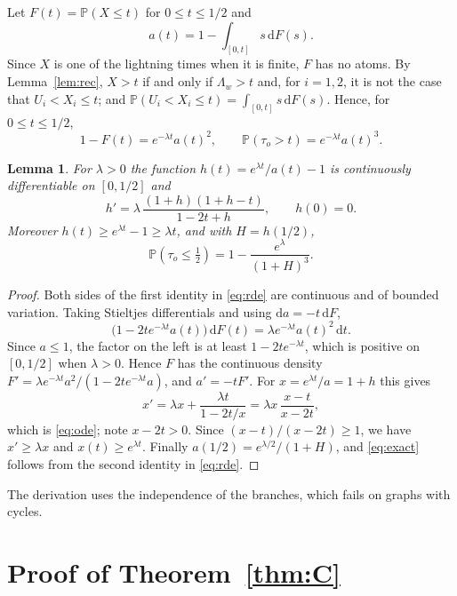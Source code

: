 \documentclass[11pt]{amsart}
\newtheorem{lemma}[theorem]{Lemma}
\theoremstyle{remark}
\numberwithin{equation}{section}
\newcommand{\PP}{\mathbb{P}}
\newcommand{\dd}{\mathrm{d}}
\begin{document}
Let $F(t)=\PP(X\le t)$ for $0\le t\le1/2$ and
\[
a(t)=1-\int_{[0,t]}s\,\dd F(s).
\]
Since $X$ is one of the lightning times when it is finite, $F$ has no
atoms. By Lemma~\ref{lem:rec}, $X>t$ if and only if $\Lambda_w>t$ and,
for $i=1,2$, it is not the case that $U_i<X_i\le t$; and
$\PP(U_i<X_i\le t)=\int_{[0,t]}s\,\dd F(s)$. Hence, for $0\le t\le1/2$,
\begin{equation}\label{eq:rde}
1-F(t)=e^{-\lambda t}a(t)^2,\qquad
\PP(\tau_o>t)=e^{-\lambda t}a(t)^3.
\end{equation}

\begin{lemma}\label{lem:ode}
For $\lambda>0$ the function $h(t)=e^{\lambda t}/a(t)-1$ is continuously
differentiable on $[0,1/2]$ and
\begin{equation}\label{eq:ode}
h'=\lambda\,\frac{(1+h)(1+h-t)}{1-2t+h},\qquad h(0)=0.
\end{equation}
Moreover $h(t)\ge e^{\lambda t}-1\ge\lambda t$, and with $H=h(1/2)$,
\begin{equation}\label{eq:exact}
\PP(\tau_o\le\tfrac12)=1-\frac{e^{\lambda}}{(1+H)^3}.
\end{equation}
\end{lemma}

\begin{proof}
Both sides of the first identity in \eqref{eq:rde} are continuous and of
bounded variation. Taking Stieltjes differentials and using
$\dd a=-t\,\dd F$,
\[
\bigl(1-2te^{-\lambda t}a(t)\bigr)\,\dd F(t)=\lambda e^{-\lambda t}a(t)^2\,\dd t.
\]
Since $a\le1$, the factor on the left is at least $1-2te^{-\lambda t}$,
which is positive on $[0,1/2]$ when $\lambda>0$. Hence $F$ has the
continuous density
$F'=\lambda e^{-\lambda t}a^2/(1-2te^{-\lambda t}a)$, and $a'=-tF'$. For
$x=e^{\lambda t}/a=1+h$ this gives
\[
x'=\lambda x+\frac{\lambda t}{1-2t/x}=\lambda x\,\frac{x-t}{x-2t},
\]
which is \eqref{eq:ode}; note $x-2t>0$. Since $(x-t)/(x-2t)\ge1$, we
have $x'\ge\lambda x$ and $x(t)\ge e^{\lambda t}$. Finally
$a(1/2)=e^{\lambda/2}/(1+H)$, and \eqref{eq:exact} follows from the
second identity in \eqref{eq:rde}.
\end{proof}

The derivation uses the independence of the branches, which fails on
graphs with cycles.

\section{Proof of Theorem~\ref{thm:C}}\label{sec:asym}
\end{document}
